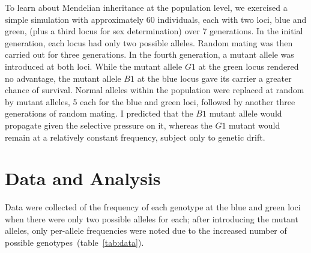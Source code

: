\documentclass{article}
\begin{document}
        To learn about Mendelian inheritance at the population level, we
            exercised a simple simulation with approximately 60 individuals,
            each with two loci, blue and green, (plus a third locus for sex
            determination) over 7 generations.
        In the initial generation, each locus had only two possible alleles.
        Random mating was then carried out for three generations.
        In the fourth generation, a mutant allele was introduced at both loci.
        While the mutant allele $G1$ at the green locus rendered no advantage,
            the mutant allele $B1$ at the blue locus gave its carrier a greater
            chance of survival.
        Normal alleles within the population were replaced at random by mutant
            alleles, 5 each for the blue and green loci, followed by another
            three generations of random mating.
        I predicted that the $B1$ mutant allele would propagate given the
            selective pressure on it, whereas the $G1$ mutant would remain at a
            relatively constant frequency, subject only to genetic drift.

    \section*{Data and Analysis}

    Data were collected of the frequency of each genotype at the blue and green
        loci when there were only two possible alleles for each; after
        introducing the mutant alleles, only per-allele frequencies were
        noted due to the increased number of possible
        genotypes~(table~\ref{tab:data}).
\end{document}
